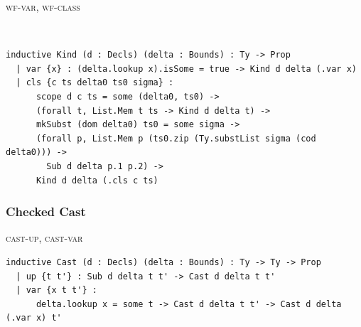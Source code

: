 \begin{cmp}{\textsc{wf-var}, \textsc{wf-class}}
\begin{paperside}
\\[1ex]
\end{paperside}
\begin{leanside}
\begin{lstlisting}[style=leanside]
inductive Kind (d : Decls) (delta : Bounds) : Ty -> Prop
  | var {x} : (delta.lookup x).isSome = true -> Kind d delta (.var x)
  | cls {c ts delta0 ts0 sigma} :
      scope d c ts = some (delta0, ts0) ->
      (forall t, List.Mem t ts -> Kind d delta t) ->
      mkSubst (dom delta0) ts0 = some sigma ->
      (forall p, List.Mem p (ts0.zip (Ty.substList sigma (cod delta0))) ->
        Sub d delta p.1 p.2) ->
      Kind d delta (.cls c ts)
\end{lstlisting}
\end{leanside}
\end{cmp}

\subsubsection{Checked Cast}

\begin{cmp}{\textsc{cast-up}, \textsc{cast-var}}
\begin{paperside}
\qquad
{}
\end{paperside}
\begin{leanside}
\begin{lstlisting}[style=leanside]
inductive Cast (d : Decls) (delta : Bounds) : Ty -> Ty -> Prop
  | up {t t'} : Sub d delta t t' -> Cast d delta t t'
  | var {x t t'} :
      delta.lookup x = some t -> Cast d delta t t' -> Cast d delta (.var x) t'
\end{lstlisting}
\end{leanside}
\end{cmp}

